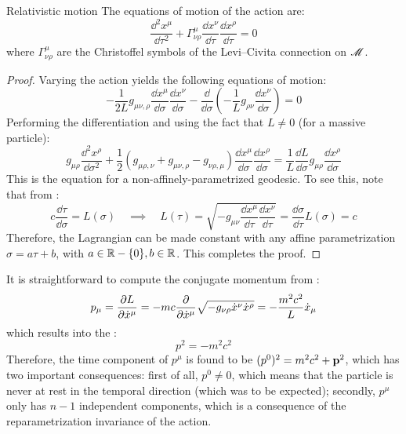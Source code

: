 \begin{proposition}{Relativistic motion}{}
  The equations of motion of the action  are:
  \begin{equation}
    \frac{\dd^2 x^\mu}{\dd \tau^2} + \Gamma^\mu_{\nu \rho} \frac{\dd x^\nu}{\dd \tau} \frac{\dd x^\rho}{\dd \tau} = 0
  \end{equation}
  where $ \Gamma^\mu_{\nu \rho} $ are the Christoffel symbols of the Levi--Civita connection on $ \mathscr{M} $.
\end{proposition}

\begin{proofbox}
  \begin{proof}
    Varying the action yields the following equations of motion:
    \begin{equation*}
      - \frac{1}{2L} g_{\mu \nu , \rho} \frac{\dd x^\mu}{\dd \sigma} \frac{\dd x^\nu}{\dd \sigma} - \frac{\dd}{\dd \sigma} \left( - \frac{1}{L} g_{\rho \nu} \frac{\dd x^\nu}{\dd \sigma} \right) = 0
    \end{equation*}
    Performing the differentiation and using the fact that $ L \neq 0 $ (for a massive particle):
    \begin{equation*}
      g_{\mu \rho} \frac{\dd^2 x^\rho}{\dd \sigma^2} + \frac{1}{2} \left( g_{\mu \rho , \nu} + g_{\mu \nu , \rho} - g_{\nu \rho , \mu} \right) \frac{\dd x^\mu}{\dd \sigma} \frac{\dd x^\rho}{\dd \sigma} = \frac{1}{L} \frac{\dd L}{\dd \sigma} g_{\mu \rho} \frac{\dd x^\rho}{\dd \sigma}
    \end{equation*}
    This is the equation for a non-affinely-parametrized geodesic. To see this, note that from :
    \begin{equation*}
      c \frac{\dd \tau}{\dd \sigma} = L(\sigma)
      \quad \implies \quad
      L(\tau) = \sqrt{- g_{\mu \nu} \frac{\dd x^\mu}{\dd \tau} \frac{\dd x^\nu}{\dd \tau}} = \frac{\dd \sigma}{\dd \tau} L(\sigma) = c
    \end{equation*}
    Therefore, the Lagrangian can be made constant with any affine parametrization $ \sigma = a \tau + b $, with $ a \in \mathbb{R} - \{0\} , b \in \mathbb{R} $. This completes the proof.
  \end{proof}
\end{proofbox}

It is straightforward to compute the conjugate momentum from :
\begin{equation*}
  p_{\mu} = \frac{\partial L}{\partial \dot x^{\mu}} = - m c \frac{\partial}{\partial \dot x^{\mu}} \sqrt{- g_{\nu \rho} \dot{x}^{\nu} \dot{x}^{\rho}} = - \frac{m^2 c^2}{L} \dot x_\mu
\end{equation*}
which results into the :
\begin{equation}
  p^2 = - m^2 c^2
\end{equation}
Therefore, the time component of $ p^\mu $ is found to be $ (p^0)^2 = m^2 c^2 + \mathbf{p}^2 $, which has two important consequences: first of all, $ p^0 \neq 0 $, which means that the particle is never at rest in the temporal direction (which was to be expected); secondly, $ p^\mu $ only has $ n - 1 $ independent components, which is a consequence of the reparametrization invariance of the action\footnotemark.

